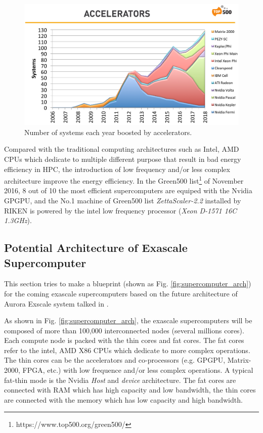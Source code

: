 \begin{figure}[htbp]
	\centering
	\includegraphics[width=6.2in]{fig/top500.pdf}
	\caption{Number of systems each year boosted by accelerators.}
	\label{top500-acc}
\end{figure}

Compared with the traditional computing architectures such as Intel, AMD CPUs which dedicate to multiple different purpose that result in bad energy efficiency in HPC, the introduction of low frequency and/or less complex architecture improve the energy efficiency. In the Green500 list\footnote{https://www.top500.org/green500/} of November 2016, 8 out of 10 the most efficient supercomputers are equiped with the Nvidia GPGPU, and the No.1 machine of Green500 list \textit{ZettaScaler-2.2} installed by RIKEN is powered by the intel low frequency processor (\textit{Xeon D-1571 16C 1.3GHz}).


\subsection{Potential Architecture of Exascale Supercomputer} \label{Potential Architecture of Exascale Supercomputer}

This section tries to make a blueprint (shown as Fig. \ref{fig:supercomputer_arch}) for the coming exascale supercomputers based on the future architecture of Aurora Exscale system talked in \cite{TheNextPlatform}.

As shown in Fig. \ref{fig:supercomputer_arch}, the exascale supercomputers will be composed of more than 100,000 interconnected nodes (several millions cores). Each compute node is packed with the thin cores and fat cores. The fat cores refer to the intel, AMD X86 CPUs which dedicate to more complex operations. The thin cores can be the accelerators and co-processors (e.g. GPGPU, Matrix-2000, FPGA, etc.) with low frequence and/or less complex operations. A typical fat-thin mode is the Nvidia \textit{Host} and \textit{device} architecture. The fat cores are connected with RAM which has high capacity and low bandwidth, the thin cores are connected with the memory which has low capacity and high bandwidth.

